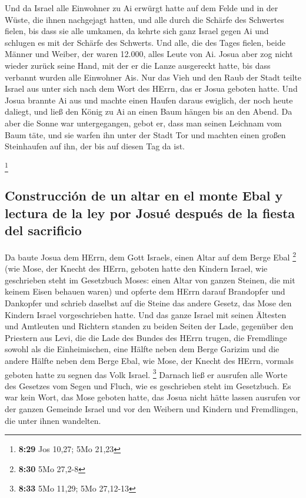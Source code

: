  Und da Israel alle Einwohner zu Ai erwürgt hatte auf dem
Felde und in der Wüste, die ihnen nachgejagt hatten, und alle durch die
Schärfe des Schwertes fielen, bis dass sie alle umkamen, da kehrte sich
ganz Israel gegen Ai und schlugen es mit der Schärfe des Schwerts.
 Und alle, die des Tages fielen, beide Männer und Weiber,
der waren 12.000, alles Leute von Ai.  Josua aber zog
nicht wieder zurück seine Hand, mit der er die Lanze ausgereckt hatte,
bis dass verbannt wurden alle Einwohner Ais.  Nur das
Vieh und den Raub der Stadt teilte Israel aus unter sich nach dem Wort
des HErrn, das er Josua geboten hatte.  Und Josua brannte
Ai aus und machte einen Haufen daraus ewiglich, der noch heute daliegt,
 und ließ den König zu Ai an einen Baum hängen bis an den
Abend. Da aber die Sonne war untergegangen, gebot er, dass man seinen
Leichnam vom Baum täte, und sie warfen ihn unter der Stadt Tor und
machten einen großen Steinhaufen auf ihn, der bis auf diesen Tag da ist.

\footnote{\textbf{8:29} Jos 10,27; 5Mo 21,23}

\hypertarget{construcciuxf3n-de-un-altar-en-el-monte-ebal-y-lectura-de-la-ley-por-josuuxe9-despuuxe9s-de-la-fiesta-del-sacrificio}{%
\subsection{Construcción de un altar en el monte Ebal y lectura de la
ley por Josué después de la fiesta del
sacrificio}\label{construcciuxf3n-de-un-altar-en-el-monte-ebal-y-lectura-de-la-ley-por-josuuxe9-despuuxe9s-de-la-fiesta-del-sacrificio}}

 Da baute Josua dem HErrn, dem Gott Israels, einen Altar
auf dem Berge Ebal \footnote{\textbf{8:30} 5Mo 27,2-8} 
(wie Mose, der Knecht des HErrn, geboten hatte den Kindern Israel, wie
geschrieben steht im Gesetzbuch Moses: einen Altar von ganzen Steinen,
die mit keinem Eisen behauen waren) und opferte dem HErrn darauf
Brandopfer und Dankopfer  und schrieb daselbst auf die
Steine das andere Gesetz, das Mose den Kindern Israel vorgeschrieben
hatte.  Und das ganze Israel mit seinen Ältesten und
Amtleuten und Richtern standen zu beiden Seiten der Lade, gegenüber den
Priestern aus Levi, die die Lade des Bundes des HErrn trugen, die
Fremdlinge sowohl als die Einheimischen, eine Hälfte neben dem Berge
Garizim und die andere Hälfte neben dem Berge Ebal, wie Mose, der Knecht
des HErrn, vormals geboten hatte zu segnen das Volk Israel. \footnote{\textbf{8:33}
  5Mo 11,29; 5Mo 27,12-13}  Darnach ließ er ausrufen alle
Worte des Gesetzes vom Segen und Fluch, wie es geschrieben steht im
Gesetzbuch.  Es war kein Wort, das Mose geboten hatte,
das Josua nicht hätte lassen ausrufen vor der ganzen Gemeinde Israel und
vor den Weibern und Kindern und Fremdlingen, die unter ihnen wandelten.

